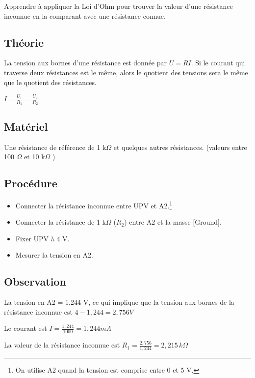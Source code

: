 \documentclass{book}
\begin{document}
Apprendre à appliquer la Loi d'Ohm pour trouver la valeur d'une résistance inconnue en la comparant avec une résistance connue.

\subsection{Théorie}


La tension aux bornes d'une résistance est donnée par $ U=RI$. Si le courant qui traverse deux résistances est le même, alors le quotient des tensions sera le même que le quotient des résistances.



$I=\frac{U_{1} }{R_{1} }=\frac{U_{2} }{R_{2} }$

\subsection{Matériel}


Une résistance de référence de 1 k$\Omega$  et quelques autres résistances. (valeurs entre 100 $\Omega$  et 10 k$\Omega$ )

\subsection{Procédure}


\begin{itemize}
  \item Connecter la résistance inconnue entre UPV et A2.\footnote{On utilise A2 quand la tension est comprise entre 0 et 5 V.}
  \item Connecter la résistance de 1 k$\Omega$  ($R_{2}$) entre A2 et la masse [Ground].
  \item Fixer UPV à 4 V.
  \item Mesurer la tension en A2.
\end{itemize}

\subsection{Observation}


La tension en A2 = 1,244 V, ce qui implique que la tension aux bornes de la résistance inconnue est $4-1,244=2,756V$



Le courant est $I=\frac{1,244}{1000}=1,244mA$



La valeur de la résistance inconnue est $R_1=\frac{2,756}{1,244}=2,215\, k\Omega$
\end{document}
